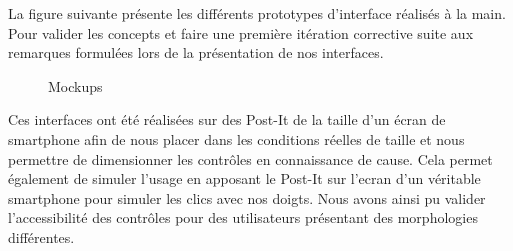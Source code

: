 
La figure suivante présente les différents prototypes d'interface réalisés à la main. Pour valider les concepts et faire une première itération corrective suite aux remarques formulées lors de la présentation de nos interfaces. \\

\begin{figure}[H]
    \label{fig-mockup1}
    \noindent{}
    \noindent{}
    \caption{Mockups}
\end{figure}

Ces interfaces ont été réalisées sur des Post-It de la taille d'un écran de smartphone afin de nous placer dans les conditions réelles de taille et nous permettre de dimensionner les contrôles en connaissance de cause. Cela permet également de simuler l'usage en apposant le Post-It sur l'ecran d'un véritable smartphone pour simuler les clics avec nos doigts. Nous avons ainsi pu valider l'accessibilité des contrôles pour des utilisateurs présentant des morphologies différentes.